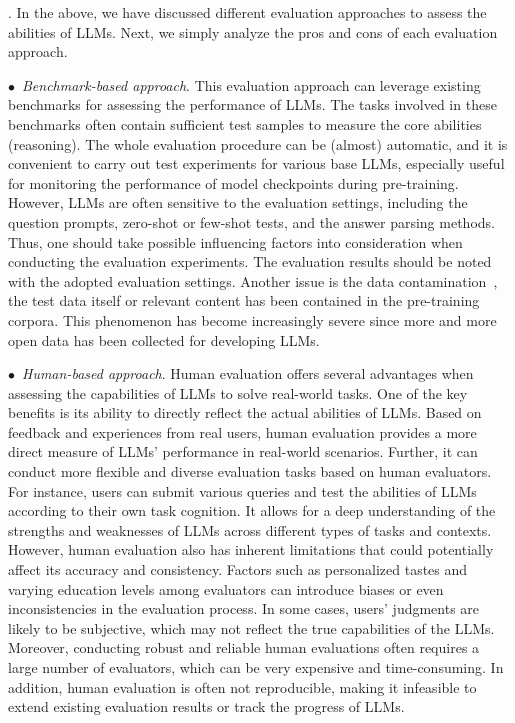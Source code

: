 . 
In the above, we have discussed different evaluation approaches to assess the abilities of LLMs.
Next, we simply analyze the pros and cons of each evaluation approach.  %

$\bullet$~\emph{Benchmark-based approach}.
This evaluation approach can leverage existing benchmarks for assessing the performance of LLMs.
The tasks involved in these benchmarks often contain sufficient test samples to measure the core abilities (\eg reasoning).
The whole evaluation procedure can be (almost) automatic, and it is convenient to carry out test experiments for various base LLMs, especially useful for monitoring the performance of model checkpoints during pre-training.
However, LLMs are often sensitive to the evaluation settings, including the question prompts, zero-shot or few-shot tests, and the answer parsing methods.
Thus, one should take possible influencing factors into consideration when conducting the evaluation experiments.
The evaluation results should be noted with the adopted evaluation settings.
Another issue is the data contamination~\cite{Chowdhery-arxiv-2022-PaLM,zhou-arxiv-2023-dont}, \ie the test data itself or relevant content has been contained in the pre-training corpora.
This phenomenon has become increasingly severe since more and more open data has been collected for developing LLMs.

$\bullet$~\emph{Human-based approach}. 
Human evaluation offers several advantages when assessing the capabilities of LLMs to solve real-world tasks.
One of the key benefits is its ability to directly reflect the actual abilities of LLMs.
Based on feedback and experiences from real users, human evaluation provides a more direct measure of LLMs' performance in real-world scenarios.
Further, it can conduct more flexible and diverse evaluation tasks based on human evaluators.
For instance, users can submit various queries and test the abilities of LLMs according to their own task cognition.
It allows for a deep understanding of the strengths and weaknesses of LLMs across different types of tasks and contexts.
However, human evaluation also has inherent limitations that could potentially affect its accuracy and consistency.
Factors such as personalized tastes and varying education levels among evaluators can introduce biases or even inconsistencies in the evaluation process.
In some cases, users' judgments are likely to be subjective, which may not reflect the true capabilities of the LLMs.
Moreover, conducting robust and reliable human evaluations often requires a large number of evaluators, which can be very expensive and time-consuming.
In addition, human evaluation is often not reproducible, making it infeasible to extend existing evaluation results or track the progress of LLMs.


